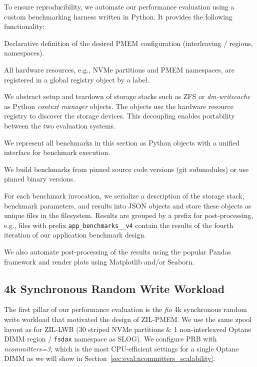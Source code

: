 \documentclass[12pt,a4paper,twoside]{book}
\begin{document}
To ensure reproducibility, we automate our performance evaluation using a custom benchmarking harness written in Python.
It provides the following functionality:
\begin{description}[noitemsep]
    \item[Declarative PMEM Provisioning] Declarative definition of the desired PMEM configuration (interleaving / regions, namespaces).
    \item[Hardware Resource Registry]  All hardware resources, e.g., NVMe partitions and PMEM namespaces, are registered in a global registry object by a label.
    \item[Unified Storage Software Configuration] We abstract setup and teardown of storage stacks such as ZFS or \textit{dm-writecache} as Python \textit{context manager} objects.
        The objects use the hardware resource registry to discover the storage devices.
        This decoupling enables portability between the two evaluation systems.
    \item[Unified Benchmark Abstraction] We represent all benchmarks in this section as Python objects with a unified interface for benchmark execution.
    \item[Pinned Software Versions] We build benchmarks from pinned source code versions (git submodules) or use pinned binary versions.
    \item[Result Storage] For each benchmark invocation, we serialize a description of the storage stack, benchmark parameters, and results into JSON objects and store these objects as unique files in the filesystem.
        Results are grouped by a prefix for post-processing, e.g., files with prefix \lstinline{app_benchmarks__v4} contain the results of the fourth iteration of our application benchmark design.
\end{description}
We also automate post-processing of the results using the popular Pandas framework and render plots using Matplotlib and/or Seaborn.

\subsection{4k Synchronous Random Write Workload}\label{sec:eval:4ksyncwrites}
The first pillar of our performance evaluation is the \textit{fio} 4k synchronous random write workload that motivated the design of ZIL-PMEM.
We use the same zpool layout as for ZIL-LWB (30 striped NVMe partitions \& 1 non-interleaved Optane DIMM region / \lstinline{fsdax} namespace as SLOG).
We configure PRB with \textit{ncommitters=3}, which is the most CPU-efficient settings for a single Optane DIMM as we will show in Section~\ref{sec:eval:ncommitters_scalability}.
\end{document}
